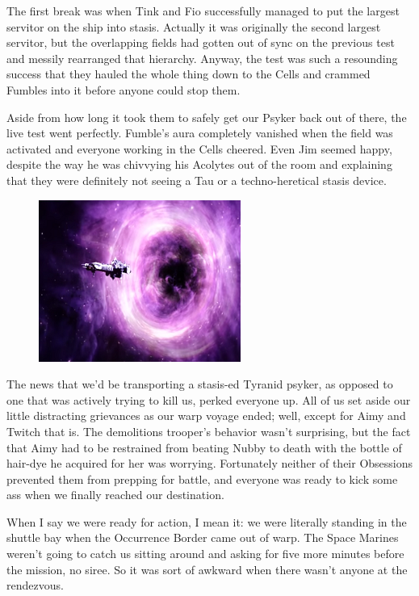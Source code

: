 The first break was when Tink and Fio successfully managed to put the largest servitor on the ship into stasis. 
Actually it was originally the second largest servitor, but the overlapping fields had gotten out of sync on the previous test and messily rearranged that hierarchy. 
Anyway, the test was such a resounding success that they hauled the whole thing down to the Cells and crammed Fumbles into it before anyone could stop them.

Aside from how long it took them to safely get our Psyker back out of there, the live test went perfectly. 
Fumble's aura completely vanished when the field was activated and everyone working in the Cells cheered. 
Even Jim seemed happy, despite the way he was chivvying his Acolytes out of the room and explaining that they were definitely not seeing a Tau or a techno-heretical stasis device.
\begin{figure}
	\begin{center}
		\includegraphics[width=\figwidth]{pics/12/12.png}
	\end{center}
\end{figure}
The news that we'd be transporting a stasis-ed Tyranid psyker, as opposed to one that was actively trying to kill us, perked everyone up. 
All of us set aside our little distracting grievances as our warp voyage ended; 
well, except for Aimy and Twitch that is. 
The demolitions trooper's behavior wasn't surprising, but the fact that Aimy had to be restrained from beating Nubby to death with the bottle of hair-dye he acquired for her was worrying. 
Fortunately neither of their Obsessions prevented them from prepping for battle, and everyone was ready to kick some ass when we finally reached our destination.

When I say we were ready for action, I mean it: 
we were literally standing in the shuttle bay when the Occurrence Border came out of warp. 
The Space Marines weren't going to catch us sitting around and asking for five more minutes before the mission, no siree. 
So it was sort of awkward when there wasn't anyone at the rendezvous.

